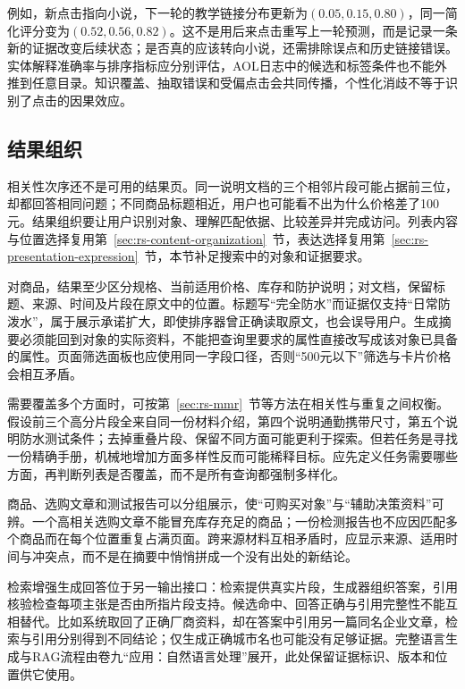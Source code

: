 例如，新点击指向小说，下一轮的教学链接分布更新为$(0.05,0.15,0.80)$，同一简化评分变为$(0.52,0.56,0.82)$。这不是用后来点击重写上一轮预测，而是记录一条新的证据改变后续状态；是否真的应该转向小说，还需排除误点和历史链接错误。实体解释准确率与排序指标应分别评估，AOL日志中的候选和标签条件也不能外推到任意目录。知识覆盖、抽取错误和受偏点击会共同传播，个性化消歧不等于识别了点击的因果效应。

\subsection{结果组织}
\label{sec:rs-search-organization}

相关性次序还不是可用的结果页。同一说明文档的三个相邻片段可能占据前三位，却都回答相同问题；不同商品标题相近，用户也可能看不出为什么价格差了100元。结果组织要让用户识别对象、理解匹配依据、比较差异并完成访问。列表内容与位置选择复用第~\ref{sec:rs-content-organization}~节，表达选择复用第~\ref{sec:rs-presentation-expression}~节，本节补足搜索中的对象和证据要求。

对商品，结果至少区分规格、当前适用价格、库存和防护说明；对文档，保留标题、来源、时间及片段在原文中的位置。标题写“完全防水”而证据仅支持“日常防泼水”，属于展示承诺扩大，即使排序器曾正确读取原文，也会误导用户。生成摘要必须能回到对象的实际资料，不能把查询里要求的属性直接改写成该对象已具备的属性。页面筛选面板也应使用同一字段口径，否则“500元以下”筛选与卡片价格会相互矛盾。

需要覆盖多个方面时，可按第~\ref{sec:rs-mmr}~节等方法在相关性与重复之间权衡。假设前三个高分片段全来自同一份材料介绍，第四个说明通勤携带尺寸，第五个说明防水测试条件；去掉重叠片段、保留不同方面可能更利于探索。但若任务是寻找一份精确手册，机械地增加方面多样性反而可能稀释目标。应先定义任务需要哪些方面，再判断列表是否覆盖，而不是所有查询都强制多样化。

商品、选购文章和测试报告可以分组展示，使“可购买对象”与“辅助决策资料”可辨。一个高相关选购文章不能冒充库存充足的商品；一份检测报告也不应因匹配多个商品而在每个位置重复占满页面。跨来源材料互相矛盾时，应显示来源、适用时间与冲突点，而不是在摘要中悄悄拼成一个没有出处的新结论。

检索增强生成回答位于另一输出接口：检索提供真实片段，生成器组织答案，引用核验检查每项主张是否由所指片段支持。候选命中、回答正确与引用完整性不能互相替代。比如系统取回了正确厂商资料，却在答案中引用另一篇同名企业文章，检索与引用分别得到不同结论；仅生成正确城市名也可能没有足够证据。完整语言生成与RAG流程由卷九“应用：自然语言处理”展开，此处保留证据标识、版本和位置供它使用。

